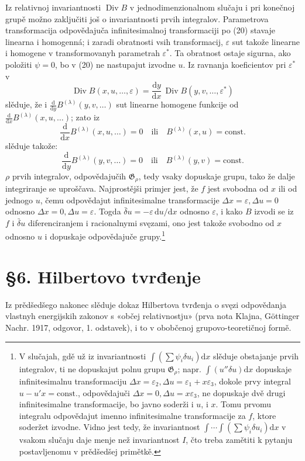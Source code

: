 \documentclass[11pt]{article}
\providecommand{\G}{\mathfrak G}
\providecommand{\eps}{\varepsilon}
\providecommand{\D}{\Delta}
\providecommand{\dd}{\mathrm d}
\DeclareMathOperator{\Div}{Div}
\providecommand{\bd}{\bar{\delta}}
\begin{document}
Iz relativnoj invariantnosti \(\Div B\) v jednodimenzionalnom slučaju i pri konečnoj grupě možno zaključiti još o invariantnosti prvih integralov. Parametrova transformacija odpovědajuča infinitesimalnoj transformaciji po (20) stavaje linearna i homogenná; i zaradi obratnosti vsih transformacij, \(\eps\) sut takože linearne i homogene v transformovanyh parametrah \(\eps^*\). Ta obratnost ostaje sigurna, ako položiti \(\psi=0\), bo v (20) ne nastupajut izvodne \(u\). Iz ravnanja koeficientov pri \(\eps^*\) v
\[
\Div B(x,u,\ldots,\eps)=\frac{\dd y}{\dd x}\,\Div B(y,v,\ldots,\eps^*)
\]
slěduje, že i \(\frac{\dd}{\dd y}B^{(\lambda)}(y,v,\ldots)\) sut linearne homogene funkcije od \(\frac{\dd}{\dd x}B^{(\lambda)}(x,u,\ldots)\); zato iz
\[
\frac{\dd}{\dd x}B^{(\lambda)}(x,u,\ldots)=0
\quad\text{ili}\quad B^{(\lambda)}(x,u)=\mathrm{const.}
\]
slěduje takože:
\[
\frac{\dd}{\dd y}B^{(\lambda)}(y,v,\ldots)=0
\quad\text{ili}\quad B^{(\lambda)}(y,v)=\mathrm{const.}
\]
\(\rho\) prvih integralov, odpovědajučih \(\G_\rho\), tedy vsaky dopuskaje grupu, tako že dalje integriranje se uproščava. Najprostějši primjer jest, že \(f\) jest svobodna od \(x\) ili od jednogo \(u\), čemu odpovědajut infinitesimalne transformacije \(\D x=\eps,\D u=0\) odnosno \(\D x=0,\D u=\eps\). Togda \(\bd u=-\eps\,\dd u/\dd x\) odnosno \(\eps\), i kako \(B\) izvodi se iz \(f\) i \(\bd u\) diferenciranjem i racionalnymi svęzami, ono jest takože svobodno od \(x\) odnosno \(u\) i dopuskaje odpovědajuče grupy.\footnote{V slučajah, gdě už iz invariantnosti \(\int(\sum\psi_i\delta u_i)\dd x\) slěduje obstajanje prvih integralov, ti ne dopuskajut polnu grupu \(\G_\rho\); napr. \(\int(u''\delta u)\dd x\) dopuskaje infinitesimalnu transformaciju \(\D x=\eps_2,\D u=\eps_1+x\eps_3\), dokole prvy integral \(u-u'x=\mathrm{const.}\), odpovědajuči \(\D x=0,\D u=x\eps_3\), ne dopuskaje dvě drugi infinitesimalne transformacije, bo javno soderži i \(u\), i \(x\). Tomu prvomu integralu odpovědajut imenno infinitesimalne transformacije za \(f\), ktore soderžet izvodne. Vidno jest tedy, že invariantnost \(\int\!\cdots\!\int(\sum\psi_i\delta u_i)\dd x\) v vsakom slučaju daje menje než invariantnost \(I\), čto treba zamětiti k pytanju postavljenomu v prědšedšej primětkě.}

\section*{\S{}6. Hilbertovo tvrđenje}

Iz prědšedšego nakonec slěduje dokaz Hilbertova tvrđenja o svęzi odpovědanja vlastnyh energijskih zakonov s «občej relativnostju» (prva nota Klajna, Göttinger Nachr. 1917, odgovor, 1. odstavek), i to v obobčenoj grupovo-teoretičnoj formě.
\end{document}
